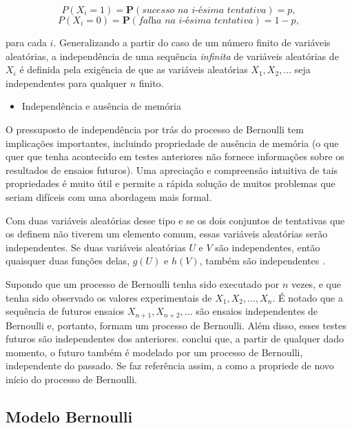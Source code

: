 $$P(X_{i} = 1) = \textbf{P}(\textit{sucesso na i-ésima tentativa}) = p, $$
$$P(X_{i} = 0) = \textbf{P}(\textit{falha na i-ésima tentativa}) = 1-p, $$

\noindent
para cada $i$. Generalizando a partir do caso de um número finito de variáveis aleatórias, a independência de uma sequência \textit{infinita} de variáveis aleatórias de $X_i$ é definida pela exigência de que as variáveis aleatórias $X_1, X_2, \dots$ seja independentes para qualquer $n$ finito.


\begin{itemize}
	\item Independência e ausência de memória
\end{itemize}

O pressuposto de independência por trás do processo de Bernoulli tem implicações importantes, incluindo propriedade de ausência de memória (o que quer que tenha acontecido em testes anteriores não fornece informações sobre os resultados de ensaios futuros). Uma apreciação e compreensão intuitiva de tais propriedades é muito útil e permite a rápida solução de muitos problemas que seriam difíceis com uma abordagem mais formal.

Com duas variáveis aleatórias desse tipo e se os dois conjuntos de tentativas que os definem não tiverem um elemento comum, essas variáveis aleatórias serão independentes. Se duas variáveis aleatórias $U$ e $V$ são independentes, então quaisquer duas funções delas, $g(U)$ e $h(V)$, também são independentes \cite{bertsekas2008}.

Supondo que um processo de Bernoulli tenha sido executado por $n$ vezes, e que tenha sido observado os valores experimentais de $X_1, X_2, ..., X_n$. É notado que a sequência de futuros ensaios $X_{n + 1}, X_{n + 2}, ...$ são ensaios independentes de Bernoulli e, portanto, formam um processo de Bernoulli. Além disso, esses testes futuros são independentes dos anteriores. \cite{bertsekas2008} conclui que, a partir de qualquer dado momento, o futuro também é modelado por um processo de Bernoulli, independente do passado. Se faz referência assim, a como a propriede de novo início do processo de Bernoulli.

\subsection{Modelo Bernoulli}

